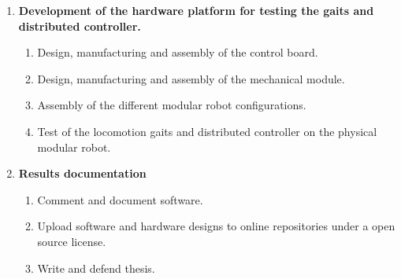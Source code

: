 \begin{enumerate}
	\item \textbf{Development of the hardware platform for testing the gaits and distributed controller.}
		\begin{enumerate}
			\item Design, manufacturing and assembly of the control board.
			\item Design, manufacturing and assembly of the mechanical module.
			\item Assembly of the different modular robot configurations.
			\item Test of the locomotion gaits and distributed controller on the physical modular robot.
			~\\
		\end{enumerate}
		
	\item \textbf{Results documentation}
		\begin{enumerate}
			\item Comment and document software.
			\item Upload software and hardware designs to online repositories under a open source license.
			\item Write and defend thesis.
		\end{enumerate}
		
\end{enumerate}